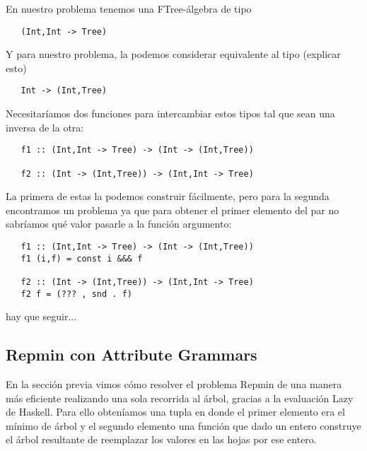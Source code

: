 \documentclass[a4paper,10pt]{article}
\begin{document}
  En nuestro problema tenemos una FTree-álgebra de tipo 
  
  \begin{lstlisting}
   (Int,Int -> Tree)
  \end{lstlisting}
  
  Y para nuestro problema, la podemos considerar equivalente al tipo (explicar esto)
  
  \begin{lstlisting}
   Int -> (Int,Tree)
  \end{lstlisting} 
  
  Necesitaríamos dos funciones para intercambiar estos tipos tal que sean una inversa de la otra:
  
  \begin{lstlisting}
   f1 :: (Int,Int -> Tree) -> (Int -> (Int,Tree))
   
   f2 :: (Int -> (Int,Tree)) -> (Int,Int -> Tree)
  \end{lstlisting}

  La primera de estas la podemos construir fácilmente, pero para la segunda encontramos un problema
  ya que para obtener el primer elemento del par no sabríamos qué valor pasarle a la función argumento:
    
  \begin{lstlisting}
   f1 :: (Int,Int -> Tree) -> (Int -> (Int,Tree))
   f1 (i,f) = const i &&& f

   f2 :: (Int -> (Int,Tree)) -> (Int,Int -> Tree)
   f2 f = (??? , snd . f)
  \end{lstlisting}

  hay que seguir...
 
  
  




\subsection{Repmin con Attribute Grammars}

  En la sección previa vimos cómo resolver el problema Repmin de una manera más eficiente realizando
  una sola recorrida al árbol, gracias a la evaluación Lazy de Haskell. Para ello obteníamos
  una tupla en donde el primer elemento era el mínimo de árbol y el segundo elemento una función
  que dado un entero construye el árbol resultante de reemplazar los valores en las hojas por ese entero.
  
\end{document}
